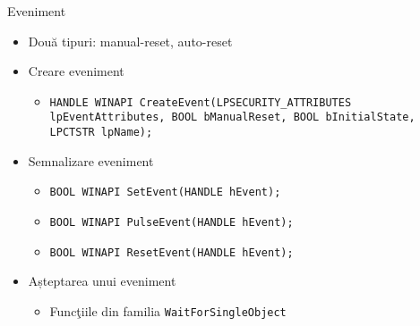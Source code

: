 \documentclass{so.cs.pub.ro}
\begin{document}
\begin{frame}{Eveniment}
        \begin{itemize}
                \item Două tipuri: manual-reset, auto-reset
                \item Creare eveniment
                        \begin{itemize}
                                  \item \texttt{HANDLE WINAPI
CreateEvent(LPSECURITY_ATTRIBUTES lpEventAttributes, BOOL bManualReset, BOOL
bInitialState, LPCTSTR lpName);}
                        \end{itemize}
                \item Semnalizare eveniment
                        \begin{itemize}
                                    \item \texttt{BOOL WINAPI SetEvent(HANDLE
hEvent);}
                                    \item \texttt{BOOL WINAPI
PulseEvent(HANDLE hEvent);}
                                    \item \texttt{BOOL WINAPI
ResetEvent(HANDLE hEvent);}
                        \end{itemize}
                \item Așteptarea unui eveniment
                        \begin{itemize}
                                    \item Funcţiile din familia
\texttt{WaitForSingleObject}
                        \end{itemize}
        \end{itemize}
\end{frame}
\end{document}
